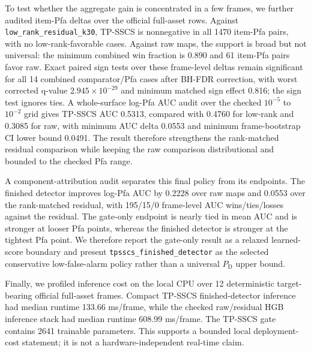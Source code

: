 \documentclass[journal]{IEEEtran}
\begin{document}
To test whether the aggregate gain is concentrated in a few frames, we further audited item-Pfa deltas over the official full-asset rows. Against \texttt{low\_rank\_residual\_k30}, TP-SSCS is nonnegative in all 1470 item-Pfa pairs, with no low-rank-favorable cases. Against raw maps, the support is broad but not universal: the minimum combined win fraction is 0.890 and 61 item-Pfa pairs favor raw. Exact paired sign tests over these frame-level deltas remain significant for all 14 combined comparator/Pfa cases after BH-FDR correction, with worst corrected q-value $2.945{\times}10^{-29}$ and minimum matched sign effect 0.816; the sign test ignores ties. A whole-surface log-Pfa AUC audit over the checked $10^{-5}$ to $10^{-2}$ grid gives TP-SSCS AUC 0.5313, compared with 0.4760 for low-rank and 0.3085 for raw, with minimum AUC delta 0.0553 and minimum frame-bootstrap CI lower bound 0.0491. The result therefore strengthens the rank-matched residual comparison while keeping the raw comparison distributional and bounded to the checked Pfa range.

A component-attribution audit separates this final policy from its endpoints. The finished detector improves log-Pfa AUC by 0.2228 over raw maps and 0.0553 over the rank-matched residual, with 195/15/0 frame-level AUC wins/ties/losses against the residual. The gate-only endpoint is nearly tied in mean AUC and is stronger at looser Pfa points, whereas the finished detector is stronger at the tightest Pfa point. We therefore report the gate-only result as a relaxed learned-score boundary and present \texttt{tpsscs\_finished\_detector} as the selected conservative low-false-alarm policy rather than a universal $P_{\mathrm{D}}$ upper bound.

Finally, we profiled inference cost on the local CPU over 12 deterministic target-bearing official full-asset frames. Compact TP-SSCS finished-detector inference had median runtime 133.66 ms/frame, while the checked raw/residual HGB inference stack had median runtime 608.99 ms/frame. The TP-SSCS gate contains 2641 trainable parameters. This supports a bounded local deployment-cost statement; it is not a hardware-independent real-time claim.
\end{document}
